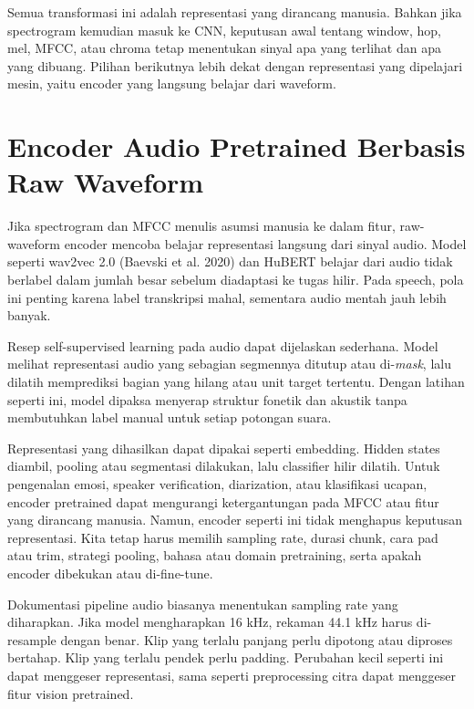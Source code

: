 Semua transformasi ini adalah representasi yang dirancang manusia. Bahkan jika spectrogram kemudian masuk ke CNN, keputusan awal tentang window, hop, mel, MFCC, atau chroma tetap menentukan sinyal apa yang terlihat dan apa yang dibuang. Pilihan berikutnya lebih dekat dengan representasi yang dipelajari mesin, yaitu encoder yang langsung belajar dari waveform.

\section{Encoder Audio Pretrained Berbasis Raw Waveform}\label{encoder-audio-pretrained-berbasis-raw-waveform}

Jika spectrogram dan MFCC menulis asumsi manusia ke dalam fitur, raw-waveform encoder mencoba belajar representasi langsung dari sinyal audio. Model seperti wav2vec 2.0 (Baevski et al. 2020) dan HuBERT belajar dari audio tidak berlabel dalam jumlah besar sebelum diadaptasi ke tugas hilir. Pada speech, pola ini penting karena label transkripsi mahal, sementara audio mentah jauh lebih banyak.

Resep self-supervised learning pada audio dapat dijelaskan sederhana. Model melihat representasi audio yang sebagian segmennya ditutup atau di-\emph{mask}, lalu dilatih memprediksi bagian yang hilang atau unit target tertentu. Dengan latihan seperti ini, model dipaksa menyerap struktur fonetik dan akustik tanpa membutuhkan label manual untuk setiap potongan suara.

Representasi yang dihasilkan dapat dipakai seperti embedding. Hidden states diambil, pooling atau segmentasi dilakukan, lalu classifier hilir dilatih. Untuk pengenalan emosi, speaker verification, diarization, atau klasifikasi ucapan, encoder pretrained dapat mengurangi ketergantungan pada MFCC atau fitur yang dirancang manusia. Namun, encoder seperti ini tidak menghapus keputusan representasi. Kita tetap harus memilih sampling rate, durasi chunk, cara pad atau trim, strategi pooling, bahasa atau domain pretraining, serta apakah encoder dibekukan atau di-fine-tune.

Dokumentasi pipeline audio biasanya menentukan sampling rate yang diharapkan. Jika model mengharapkan 16 kHz, rekaman 44.1 kHz harus di-resample dengan benar. Klip yang terlalu panjang perlu dipotong atau diproses bertahap. Klip yang terlalu pendek perlu padding. Perubahan kecil seperti ini dapat menggeser representasi, sama seperti preprocessing citra dapat menggeser fitur vision pretrained.

